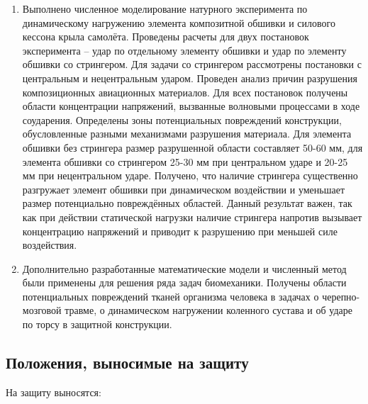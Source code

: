 \begin{enumerate}
\item Выполнено численное моделирование натурного эксперимента по динамическому нагружению элемента композитной обшивки и силового кессона крыла самолёта. Проведены расчеты для двух постановок эксперимента -- удар по отдельному элементу обшивки и удар по элементу обшивки со стрингером. Для задачи со стрингером рассмотрены постановки с центральным и нецентральным ударом. Проведен анализ причин разрушения композиционных авиационных материалов. Для всех постановок получены области концентрации напряжений, вызванные волновыми процессами в ходе соударения. Определены зоны потенциальных повреждений конструкции, обусловленные разными механизмами разрушения материала. Для элемента обшивки без стрингера размер разрушенной области составляет 50-60 мм, для элемента обшивки со стрингером 25-30 мм при центральном ударе и 20-25 мм при нецентральном ударе. Получено, что наличие стрингера существенно разгружает элемент обшивки при динамическом воздействии и уменьшает размер потенциально повреждённых областей. Данный результат важен, так как при действии статической нагрузки наличие стрингера напротив вызывает концентрацию напряжений и приводит к разрушению при меньшей силе воздействия.

\item Дополнительно разработанные математические модели и численный метод были применены для решения ряда задач биомеханики. Получены области потенциальных повреждений тканей организма человека в задачах о черепно-мозговой травме, о динамическом нагружении коленного сустава и об ударе по торсу в защитной конструкции.

\end{enumerate}


\subsection*{Положения, выносимые на защиту}

На защиту выносятся:

